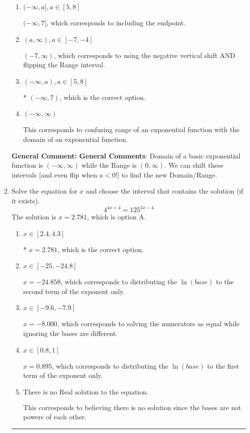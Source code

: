 \documentclass{extbook}[14pt]
\newcommand{\litem}[1]{\item #1

\rule{\textwidth}{0.4pt}}
\begin{document}
\begin{enumerate}
{\begin{enumerate}[label=\Alph*.]
$[-7, \infty)$, which corresponds to using the negative vertical shift AND flipping the Range interval AND including the endpoint.
\item \( (-\infty, a], a \in [5, 8] \)

$(-\infty, 7]$, which corresponds to including the endpoint.
\item \( (a, \infty), a \in [-7, -4] \)

$(-7, \infty)$, which corresponds to using the negative vertical shift AND flipping the Range interval.
\item \( (-\infty, a), a \in [5, 8] \)

* $(-\infty, 7)$, which is the correct option.
\item \( (-\infty, \infty) \)

This corresponds to confusing range of an exponential function with the domain of an exponential function.
\end{enumerate}

\textbf{General Comment:} \textbf{General Comments}: Domain of a basic exponential function is $(-\infty, \infty)$ while the Range is $(0, \infty)$. We can shift these intervals [and even flip when $a<0$!] to find the new Domain/Range.
}
\litem{
Solve the equation for $x$ and choose the interval that contains the solution (if it exists).
\[ 4^{4x+4} = 125^{3x-4} \]The solution is \( x = 2.781 \), which is option A.\begin{enumerate}[label=\Alph*.]
\item \( x \in [2.4, 4.3] \)

* $x = 2.781$, which is the correct option.
\item \( x \in [-25, -24.8] \)

$x = -24.858$, which corresponds to distributing the $\ln(base)$ to the second term of the exponent only.
\item \( x \in [-9.6, -7.9] \)

$x = -8.000$, which corresponds to solving the numerators as equal while ignoring the bases are different.
\item \( x \in [0.8, 1] \)

$x = 0.895$, which corresponds to distributing the $\ln(base)$ to the first term of the exponent only.
\item \( \text{There is no Real solution to the equation.} \)

This corresponds to believing there is no solution since the bases are not powers of each other.
\end{enumerate}

}
\end{enumerate}
\end{document}
